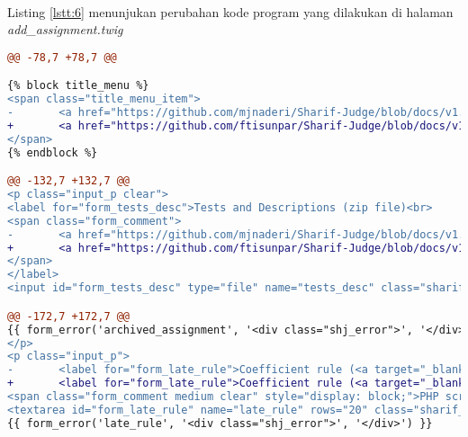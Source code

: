 ~\\
	Listing \ref{lstt:6} menunjukan perubahan kode program yang dilakukan di halaman \textit{add\_assignment.twig}
\begin{lstlisting}[language=diff, caption=Perubahan kode program pada halaman \textit{add\_assignment.twig}, label=lstt:6, basicstyle=\ttfamily, frame=single, columns=fullflexible, keepspaces=true, breaklines=true]
@@ -78,7 +78,7 @@

{% block title_menu %}
<span class="title_menu_item">
-       <a href="https://github.com/mjnaderi/Sharif-Judge/blob/docs/v1.4/add_assignment.md" target="_blank"><i class="fa fa-question-circle color1"></i> Help</a>
+       <a href="https://github.com/ftisunpar/Sharif-Judge/blob/docs/v1.4/add_assignment.md" target="_blank"><i class="fa fa-question-circle color1"></i> Help</a>
</span>
{% endblock %}

@@ -132,7 +132,7 @@
<p class="input_p clear">
<label for="form_tests_desc">Tests and Descriptions (zip file)<br>
<span class="form_comment">
-       <a href="https://github.com/mjnaderi/Sharif-Judge/blob/docs/v1.4/tests_structure.md" target="_blank">Use this structure</a>
+       <a href="https://github.com/ftisunpar/Sharif-Judge/blob/docs/v1.4/tests_structure.md" target="_blank">Use this structure</a>
</span>
</label>
<input id="form_tests_desc" type="file" name="tests_desc" class="sharif_input medium"/>

@@ -172,7 +172,7 @@
{{ form_error('archived_assignment', '<div class="shj_error">', '</div>') }}
</p>
<p class="input_p">
-       <label for="form_late_rule">Coefficient rule (<a target="_blank" href="https://github.com/mjnaderi/Sharif-Judge/blob/docs/v1.4/add_assignment.md#coefficient-rule">?</a>)</label><br>
+       <label for="form_late_rule">Coefficient rule (<a target="_blank" href="https://github.com/ftisunpar/Sharif-Judge/blob/docs/v1.4/add_assignment.md#coefficient-rule">?</a>)</label><br>
<span class="form_comment medium clear" style="display: block;">PHP script without &lt;?php ?&gt; tags</span>
<textarea id="form_late_rule" name="late_rule" rows="20" class="sharif_input add_text">{{ edit ? edit_assignment.late_rule : set_value('late_rule', default_late_rule) }}</textarea>
{{ form_error('late_rule', '<div class="shj_error">', '</div>') }}


\end{lstlisting}

